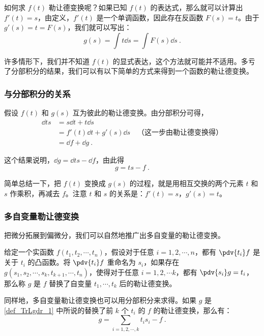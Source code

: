 如何求 $f(t)$ 勒让德变换呢？如果已知 $f(t)$ 的表达式，那么就可以计算出 $f'(t)=s$，由定义，$f'(t)$ 是一个单调函数，因此存在反函数 $F(s)=t$。由于 $g'(s)=t=F(s)$，我们就可以写出：
\begin{equation}
g(s)=\int t \dd{s}=\int F(s) \dd{s}~.
\end{equation}

许多情形下，我们并不知道 $f(t)$ 的显式表达，这个方法就可能并不适用。多亏了分部积分的结果，我们可以有以下简单的方式来得到一个函数的勒让德变换。


\subsubsection{与分部积分的关系}

假设 $f(t)$ 和 $g(s)$ 互为彼此的勒让德变换。由分部积分可得，
\begin{equation}
\begin{aligned}
\dd{ts}&=s\dd{t}+t\dd{s}\\&=f'(t)\dd{t}+g'(s)\dd{s}\quad\text{（这一步由勒让德变换得）}\\&=\dd{f}+\dd{g}~.
\end{aligned}
\end{equation}

这个结果说明，$\dd{g}=\dd{ts}-\dd{f}$，由此得
\begin{equation}
g=ts-f~.
\end{equation}

简单总结一下，把 $f(t)$ 变换成 $g(s)$ 的过程，就是用相互交换的两个元素 $t$ 和 $s$ 作乘积，再减去 $f$。注意 $t$ 和 $s$ 的关系是：$f'(t)=s$，$g'(s)=t$。

\subsubsection{多自变量勒让德变换}

把微分拓展到偏微分，我们可以自然地推广出多自变量的勒让德变换。

\begin{definition}{}\label{def_TrLgdr_1}
给定一个实函数 $f(t_1, t_2, \cdots, t_n)$，假设对于任意 $i=1, 2, \cdots, n$，都有 $\pdv{t_i}f$ 是关于 $t_i$ 的凸函数。将 $\pdv{t_i}f$ 重命名为 $s_i$，如果存在 $g(s_1, s_2, \cdots, s_k, t_{k+1},\cdots, t_n)$，使得对于任意 $i=1,2,\cdots k$，都有 $\pdv{s_i}g=t_i$，那么称 $g$ 是 $f$ 替换了自变量 $t_1, \cdots, t_k$ 后的勒让德变换。
\end{definition}

同样地，多自变量勒让德变换也可以用分部积分来求得。如果 $g$ 是\autoref{def_TrLgdr_1} 中所说的替换了前 $k$ 个 $t_i$ 的 $f$ 的勒让德变换，那么有：\begin{equation}\label{eq_TrLgdr_1}
g=\sum\limits_{i=1,2,\cdots, k}t_is_i-f~.
\end{equation}

